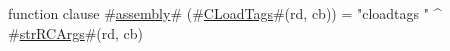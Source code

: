 function clause #\hyperref[sailMIPSzassembly]{assembly}# (#\hyperref[sailMIPSzCLoadTags]{CLoadTags}#(rd, cb)) = "cloadtags " ^ #\hyperref[sailMIPSzstrRCArgs]{strRCArgs}#(rd, cb)
